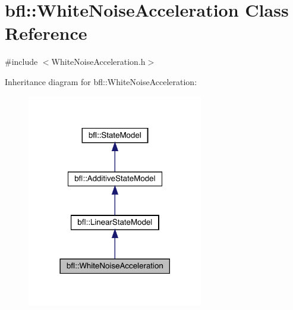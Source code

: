 \hypertarget{classbfl_1_1WhiteNoiseAcceleration}{}\section{bfl\+:\+:White\+Noise\+Acceleration Class Reference}
\label{classbfl_1_1WhiteNoiseAcceleration}


{\ttfamily \#include $<$White\+Noise\+Acceleration.\+h$>$}



Inheritance diagram for bfl\+:\+:White\+Noise\+Acceleration\+:
\nopagebreak
\begin{figure}[H]
\begin{center}
\leavevmode
\includegraphics[width=218pt]{classbfl_1_1WhiteNoiseAcceleration__inherit__graph}
\end{center}
\end{figure}
